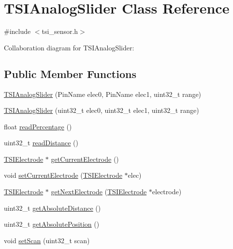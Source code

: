 \hypertarget{classTSIAnalogSlider}{}\section{T\+S\+I\+Analog\+Slider Class Reference}
\label{classTSIAnalogSlider}


{\ttfamily \#include $<$tsi\+\_\+sensor.\+h$>$}



Collaboration diagram for T\+S\+I\+Analog\+Slider\+:
\subsection*{Public Member Functions}
\begin{DoxyCompactItemize}
\item 
\hyperlink{classTSIAnalogSlider_aa7c73012cb715e5a8cec98a045144cd5}{T\+S\+I\+Analog\+Slider} (Pin\+Name elec0, Pin\+Name elec1, uint32\+\_\+t range)
\item 
\hyperlink{classTSIAnalogSlider_a49ba52acddfca420f88d3b5f8139a479}{T\+S\+I\+Analog\+Slider} (uint32\+\_\+t elec0, uint32\+\_\+t elec1, uint32\+\_\+t range)
\item 
float \hyperlink{classTSIAnalogSlider_ac0812dc15ed30773aa7781b69e6ce3a1}{read\+Percentage} ()
\item 
uint32\+\_\+t \hyperlink{classTSIAnalogSlider_a84b766f99eff19d34794b35d36bad9ce}{read\+Distance} ()
\item 
\hyperlink{classTSIElectrode}{T\+S\+I\+Electrode} $\ast$ \hyperlink{classTSIAnalogSlider_a8bb6a903053b36dc48406b2a40b430f9}{get\+Current\+Electrode} ()
\item 
void \hyperlink{classTSIAnalogSlider_ae240061e19ff1cf2edf3fbac1ad692d9}{set\+Current\+Electrode} (\hyperlink{classTSIElectrode}{T\+S\+I\+Electrode} $\ast$elec)
\item 
\hyperlink{classTSIElectrode}{T\+S\+I\+Electrode} $\ast$ \hyperlink{classTSIAnalogSlider_ae6d24bf30c95c66c37f8b36d51ce5c64}{get\+Next\+Electrode} (\hyperlink{classTSIElectrode}{T\+S\+I\+Electrode} $\ast$electrode)
\item 
uint32\+\_\+t \hyperlink{classTSIAnalogSlider_a9600bda1c2ceda17005f8a4dc0eca6c8}{get\+Absolute\+Distance} ()
\item 
uint32\+\_\+t \hyperlink{classTSIAnalogSlider_ab59fd60a46d2bb50f490118e3e1303ac}{get\+Absolute\+Position} ()
\item 
void \hyperlink{classTSIAnalogSlider_ac80a348b46988a493951a6e3a6116ec7}{set\+Scan} (uint32\+\_\+t scan)
\end{DoxyCompactItemize}
